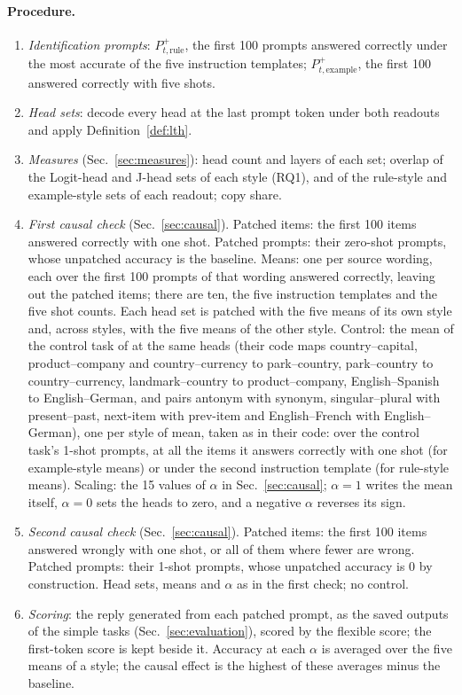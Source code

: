 \documentclass[11pt,a4paper]{article}
\begin{document}
\paragraph{Procedure.}
\begin{enumerate}
\item \emph{Identification prompts}: $P^{+}_{t,\text{rule}}$, the first 100 prompts answered correctly under the most accurate of the five instruction templates; $P^{+}_{t,\text{example}}$, the first 100 answered correctly with five shots.
\item \emph{Head sets}: decode every head at the last prompt token under both readouts and apply Definition~\ref{def:lth}.
\item \emph{Measures} (Sec.~\ref{sec:measures}): head count and layers of each set; overlap of the Logit-head and J-head sets of each style (RQ1), and of the rule-style and example-style sets of each readout; copy share.
\item \emph{First causal check} (Sec.~\ref{sec:causal}). Patched items: the first 100 items answered correctly with one shot. Patched prompts: their zero-shot prompts, whose unpatched accuracy is the baseline. Means: one per source wording, each over the first 100 prompts of that wording answered correctly, leaving out the patched items; there are ten, the five instruction templates and the five shot counts. Each head set is patched with the five means of its own style and, across styles, with the five means of the other style. Control: the mean of the control task of \citet{yang2026shared} at the same heads (their code maps country--capital, product--company and country--currency to park--country, park--country to country--currency, landmark--country to product--company, English--Spanish to English--German, and pairs antonym with synonym, singular--plural with present--past, next-item with prev-item and English--French with English--German), one per style of mean, taken as in their code: over the control task's 1-shot prompts, at all the items it answers correctly with one shot (for example-style means) or under the second instruction template (for rule-style means). Scaling: the 15 values of $\alpha$ in Sec.~\ref{sec:causal}; $\alpha=1$ writes the mean itself, $\alpha=0$ sets the heads to zero, and a negative $\alpha$ reverses its sign.
\item \emph{Second causal check} (Sec.~\ref{sec:causal}). Patched items: the first 100 items answered wrongly with one shot, or all of them where fewer are wrong. Patched prompts: their 1-shot prompts, whose unpatched accuracy is 0 by construction. Head sets, means and $\alpha$ as in the first check; no control.
\item \emph{Scoring}: the reply generated from each patched prompt, as the saved outputs of the simple tasks (Sec.~\ref{sec:evaluation}), scored by the flexible score; the first-token score is kept beside it. Accuracy at each $\alpha$ is averaged over the five means of a style; the causal effect is the highest of these averages minus the baseline.
\end{enumerate}
\end{document}
